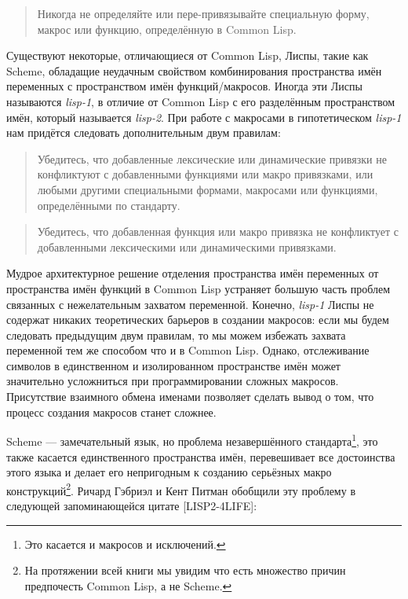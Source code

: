 \begin{quote}
Никогда не определяйте или пере-привязывайте специальную форму, макрос или функцию, определённую в Common Lisp.
\end{quote}

Существуют некоторые, отличающиеся от Common Lisp, Лиспы, такие как {Scheme}, обладащие неудачным свойством комбинирования пространства имён переменных с пространством имён функций/макросов. Иногда эти Лиспы называются \emph{lisp-1}, в отличие от Common Lisp с его разделённым пространством имён, который называется \emph{lisp-2}. При работе с макросами в гипотетическом \emph{lisp-1} нам придётся следовать дополнительным двум правилам:

\begin{quote}
Убедитесь, что добавленные лексические или динамические привязки не конфликтуют с добавленными функциями или макро привязками, или любыми другими специальными формами, макросами или функциями, определёнными по стандарту.
\end{quote}

\begin{quote}
Убедитесь, что добавленная функция или макро привязка не конфликтует с добавленными лексическими или динамическими привязками.
\end{quote}

Мудрое архитектурное решение отделения пространства имён переменных от пространства имён функций в Common Lisp устраняет большую часть проблем связанных с нежелательным захватом переменной. Конечно, \emph{lisp-1} Лиспы не содержат никаких теоретических барьеров в создании макросов: если мы будем следовать предыдущим двум правилам, то мы можем избежать захвата переменной тем же способом что и в Common Lisp. Однако, отслеживание символов в единственном и изолированном пространстве имён может значительно усложниться при программировании сложных макросов. Присутствие взаимного обмена именами позволяет сделать вывод о том, что процесс создания макросов станет сложнее.

Scheme --- замечательный язык, но проблема незавершённого стандарта\footnote{Это касается и макросов и исключений.}, это также касается единственного пространства имён, перевешивает все достоинства этого языка и делает его непригодным к созданию серьёзных макро конструкций\footnote{На протяжении всей книги мы увидим что есть множество причин предпочесть Common Lisp, а не Scheme.}. Ричард Гэбриэл и Кент Питман обобщили эту проблему в следующей запоминающейся цитате [LISP2-4LIFE]:

